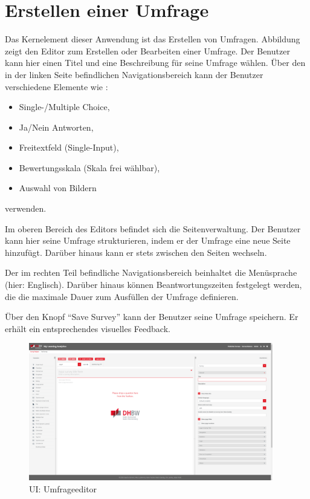 \section{Erstellen einer Umfrage}
\label{ssec:CreateMaster}

Das Kernelement dieser Anwendung ist das Erstellen von Umfragen.
Abbildung~ zeigt den Editor zum Erstellen oder Bearbeiten einer Umfrage. \newline
Der Benutzer kann hier einen Titel und eine Beschreibung für seine Umfrage wählen.
Über den in der linken Seite befindlichen Navigationsbereich kann der Benutzer verschiedene Elemente wie \ua:
%
\begin{itemize}
    \item Single-/Multiple Choice,
    \item Ja/Nein Antworten,
    \item Freitextfeld (Single-Input),
    \item Bewertungsskala (Skala frei wählbar),
    \item Auswahl von Bildern
\end{itemize}
%
verwenden.

Im oberen Bereich des Editors befindet sich die Seitenverwaltung.
Der Benutzer kann hier seine Umfrage strukturieren, indem er der Umfrage eine neue Seite hinzufügt.
Darüber hinaus kann er stets zwischen den Seiten wechseln.

Der im rechten Teil befindliche Navigationsbereich beinhaltet \ua die Menüsprache (hier: Englisch).
Darüber hinaus können Beantwortungszeiten festgelegt werden, die die maximale Dauer zum Ausfüllen der Umfrage definieren.

Über den Knopf \enquote{Save Survey} kann der Benutzer seine Umfrage speichern.
Er erhält ein entsprechendes visuelles Feedback.

\begin{figure}[H]
	\centering
	\includegraphics[width=0.95\textwidth, keepaspectratio]{img/guide/SurveyTemplate.png}
	\captionsetup{justification=centering, format=plain}
	\caption[\acl{UI}: Umfrageeditor]{\acl{UI}: Umfrageeditor \\\quelleScreenshot}
	\label{fig:Umfrageeditor}
\end{figure}

